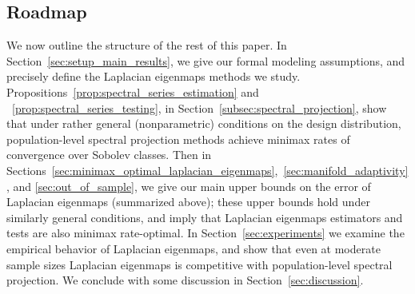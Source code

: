 \documentclass[aos]{imsart}
\theoremstyle{plain}
\theoremstyle{definition}
\theoremstyle{remark}
\newcommand{\1}{\mathbf{1}}
\begin{document}
\subsection{Roadmap}
We now outline the structure of the rest of this paper. In Section~\ref{sec:setup_main_results}, we give our formal modeling assumptions, and precisely define the Laplacian eigenmaps methods we study. Propositions~\ref{prop:spectral_series_estimation} and ~\ref{prop:spectral_series_testing}, in Section~\ref{subsec:spectral_projection}, show that under rather general (nonparametric) conditions on the design distribution, population-level spectral projection methods achieve minimax rates of convergence over Sobolev classes. Then in Sections~\ref{sec:minimax_optimal_laplacian_eigenmaps},~\ref{sec:manifold_adaptivity}, and \ref{sec:out_of_sample}, we give our main upper bounds on the error of Laplacian eigenmaps (summarized above); these upper bounds hold under similarly general conditions, and imply that Laplacian eigenmaps estimators and tests are also minimax rate-optimal. In Section~\ref{sec:experiments} we examine the empirical behavior of Laplacian eigenmaps, and show that even at moderate sample sizes Laplacian eigenmaps is competitive with population-level spectral projection. We conclude with some discussion in Section~\ref{sec:discussion}. 
\end{document}

